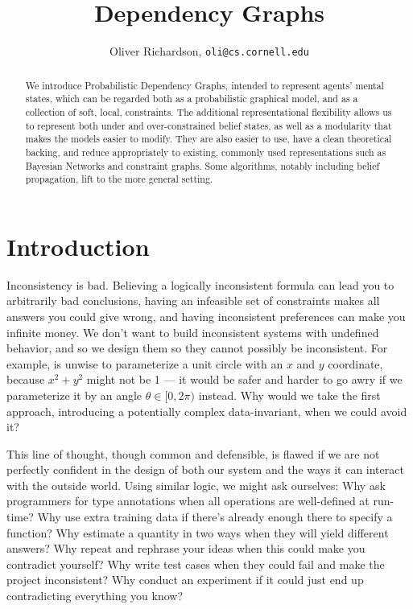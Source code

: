 \documentclass{article}
\title{Dependency Graphs}
\author{Oliver Richardson,  \texttt{oli@cs.cornell.edu}}
\newcommand{\modelname}{Probabilistic Dependency Graph}
\begin{document}
	\maketitle
	
	\begin{abstract}
		We introduce \modelname{}s, intended to represent agents' mental states, which can be regarded both as a probabilistic graphical model, and as a collection of soft, local, constraints. The additional representational flexibility allows us to represent both under and over-constrained belief states, as well as a modularity that makes the models easier to modify. They are also easier to use, have a clean theoretical backing, and reduce appropriately to existing, commonly used representations such as Bayesian Networks and constraint graphs. Some algorithms, notably including belief propagation, lift to the more general setting.
	\end{abstract}
	
	\section{Introduction}
	Inconsistency is bad. Believing a logically inconsistent formula can lead you to arbitrarily bad conclusions, having an infeasible set of constraints makes all answers you could give wrong, and having inconsistent preferences can make you infinite money. We don't want to build inconsistent systems with undefined behavior, and so we design them so they cannot possibly be inconsistent. For example, is unwise to parameterize a unit circle with an $x$ and $y$ coordinate, because $x^2+ y^2$ might not be 1 --- it would be safer and harder to go awry if we parameterize it by an angle $\theta \in [0, 2\pi)$ instead. Why would we take the first approach, introducing a potentially complex data-invariant, when we could avoid it?
	
	This line of thought, though common and defensible, is flawed if we are not perfectly confident in the design of both our system and the ways it can interact with the outside world. Using similar logic, we might ask ourselves: Why ask programmers for type annotations when all operations are well-defined at run-time?  Why use extra training data if there's already enough there to specify a function? Why estimate a quantity in two ways when they will yield different answers? Why repeat and rephrase your ideas when this could make you contradict yourself? Why write test cases when they could fail and make the project inconsistent? Why conduct an experiment if it could just end up contradicting everything you know?
	
\end{document}
